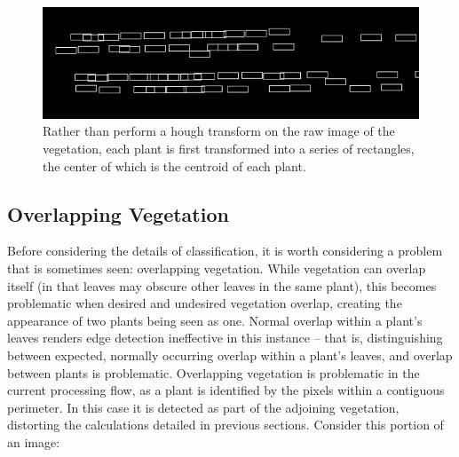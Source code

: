 \documentclass[letterpaper]{article}
\begin{document}
{\begin{figure}[h!]
	\centering
	\includegraphics[width=0.8\linewidth]{./figures/hough-transform-rectangles.jpg}
	\caption[Rectangles for hough transform]{Rather than perform a hough transform on the raw image of the vegetation, each plant is first transformed into a series of rectangles, the center of which is the centroid of each plant. }
	\label{fig:hough-transform}
\end{figure}



\subsection{Overlapping Vegetation}
\label{problem-overlap}

Before considering the details of classification, it is worth considering a problem that is sometimes seen: overlapping vegetation. While vegetation can overlap itself (in that leaves may obscure other leaves in the same plant), this becomes problematic when desired and undesired vegetation overlap, creating the appearance of two plants being seen as one. Normal overlap within a plant's leaves renders edge detection ineffective in this instance -- that is, distinguishing between expected, normally occurring overlap within a plant's leaves, and overlap between plants is problematic. Overlapping vegetation is problematic in the current processing flow, as a plant is identified by the pixels within a contiguous  perimeter. In this case it is detected as part of the adjoining vegetation, distorting the calculations detailed in previous sections.  Consider this portion of an image:

}
\end{document}
